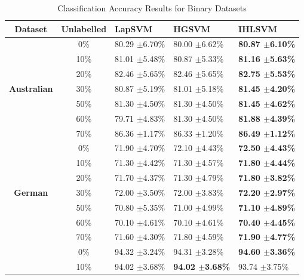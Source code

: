 \documentclass[12pt,a4paper,oneside,english]{report}
\renewcommand{\tabcolsep}{0.5cm}
\begin{document}
\begin{table}[htbp]
	\caption{Classification Accuracy Results for Binary Datasets}
\small
	\centering
	\setlength\tabcolsep{0pt}
	\begin{tabular*}{\linewidth}{@{\extracolsep{\fill}} |c|clll| }
		\hline
		\textbf{ Dataset} & \textbf{Unlabelled } & \textbf{LapSVM} & \textbf{HGSVM} & \textbf{IHLSVM } \\ \hline
		~ & 0\% & 80.29 $\pm$6.70\%  & 80.00 $\pm$6.62\% & \textbf{80.87 $\pm$6.10\% }  \\ 
		~ & 10\% & 81.01 $\pm$5.48\%  & 80.87 $\pm$5.33\%  & \textbf{81.16 $\pm$5.63\% }  \\ 
            ~ & 20\% & 82.46 \(\pm\)5.65\%  & 82.46 \(\pm\)5.65\%  & \textbf{82.75 \(\pm\)5.53\%} \\
            \textbf{ Australian }  & 30\% & 80.87 $\pm$5.19\% & 81.01 $\pm$5.18\%  & \textbf{81.45 $\pm$4.20\%} \\ 
		~ & 50\% & 81.30 $\pm$4.50\%  & 81.30 $\pm$4.50\%  & \textbf{81.45 $\pm$4.62\%}  \\ 
            ~ & 60\% & 79.71 \(\pm\)4.83\%  & 81.30 \(\pm\)4.50\%  & \textbf{81.88 \(\pm\)4.39\%} \\
            ~ & 70\% & 86.36 \(\pm\)1.17\%  & 86.33 \(\pm\)1.20\%  & \textbf{86.49 \(\pm\)1.12\%} \\ 
		\hline
		~ & 0\% & 71.90 $\pm$4.70\% & 72.10 $\pm$4.43\%  & \textbf{72.50 $\pm$4.43\%}  \\ 
		~ & 10\% & 71.30 $\pm$4.42\% & 71.30 $\pm$4.57\% & \textbf{71.80 $\pm$4.44\%} \\ 
            ~ & 20\% & 71.70 \(\pm\)4.37\%  & 71.30 \(\pm\)4.79\% &  \textbf{71.80 \(\pm\)3.82\%} \\
		\textbf{ German } & 30\% & 72.00 $\pm$3.50\%  & 72.00 $\pm$3.83\% & \textbf{72.20 $\pm$2.97\%}  \\ 
		~ & 50\% & 70.80 $\pm$5.35\%  & 71.00 $\pm$4.99\%  & \textbf{71.10 $\pm$4.89\%}  \\ 
            ~ & 60\% & 70.10 \(\pm\)4.61\%  & 70.10 \(\pm\)4.61\% &  \textbf{70.40 \(\pm\)4.45\%} \\
            ~ & 70\% & 71.60 \(\pm\)4.30\%  & 71.80 \(\pm\)4.59\% &  \textbf{71.90 \(\pm\)4.77\%} \\ 
		\hline
		~ & 0\% & 94.32 $\pm$3.24\%  & 94.31 $\pm$3.28\%  & \textbf{94.60 $\pm$3.36\%} \\
		~ & 10\% & 94.02 $\pm$3.68\% & \textbf{94.02 $\pm$3.68\%}  & 93.74 $\pm$3.75\% \\ 

\end{tabular*}
\end{table}
\end{document}
